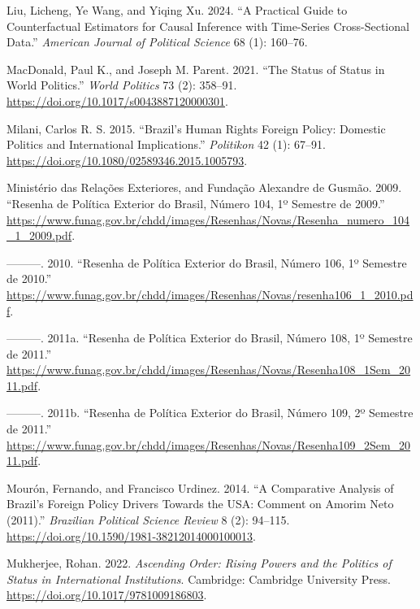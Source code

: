 \documentclass[
  12pt,
]{article}
\newlength{\cslhangindent}
\newenvironment{CSLReferences}[2] %
 {\begin{list}{}{%
  \setlength{\itemindent}{0pt}
  \setlength{\leftmargin}{0pt}
  \setlength{\parsep}{0pt}
  \ifodd #1
   \setlength{\leftmargin}{\cslhangindent}
   \setlength{\itemindent}{-1\cslhangindent}
  \fi
  \setlength{\itemsep}{#2\baselineskip}}}
 {\end{list}}
\begin{document}
\begin{CSLReferences}{1}{0}
Liu, Licheng, Ye Wang, and Yiqing Xu. 2024. {``A Practical Guide to Counterfactual Estimators for Causal Inference with Time-Series Cross-Sectional Data.''} \emph{American Journal of Political Science} 68 (1): 160--76.

MacDonald, Paul K., and Joseph M. Parent. 2021. {``The {Status} of {Status} in {World Politics}.''} \emph{World Politics} 73 (2): 358--91. \url{https://doi.org/10.1017/s0043887120000301}.

Milani, Carlos R. S. 2015. {``{Brazil}'s Human Rights Foreign Policy: Domestic Politics and International Implications.''} \emph{Politikon} 42 (1): 67--91. \url{https://doi.org/10.1080/02589346.2015.1005793}.

Ministério das Relações Exteriores, and Fundação Alexandre de Gusmão. 2009. {``Resenha de Política Exterior do Brasil, Número 104, 1º Semestre de 2009.''} \url{https://www.funag.gov.br/chdd/images/Resenhas/Novas/Resenha_numero_104_1_2009.pdf}.

---------. 2010. {``Resenha de Política Exterior do Brasil, Número 106, 1º Semestre de 2010.''} \url{https://www.funag.gov.br/chdd/images/Resenhas/Novas/resenha106_1_2010.pdf}.

---------. 2011a. {``Resenha de Política Exterior do Brasil, Número 108, 1º Semestre de 2011.''} \url{https://www.funag.gov.br/chdd/images/Resenhas/Novas/Resenha108_1Sem_2011.pdf}.

---------. 2011b. {``Resenha de Política Exterior do Brasil, Número 109, 2º Semestre de 2011.''} \url{https://www.funag.gov.br/chdd/images/Resenhas/Novas/Resenha109_2Sem_2011.pdf}.

Mourón, Fernando, and Francisco Urdinez. 2014. {``A {Comparative Analysis} of {Brazil}'s {Foreign Policy Drivers Towards} the {USA}: {Comment} on {Amorim Neto} (2011).''} \emph{Brazilian Political Science Review} 8 (2): 94--115. \url{https://doi.org/10.1590/1981-38212014000100013}.

Mukherjee, Rohan. 2022. \emph{Ascending Order: Rising Powers and the Politics of Status in International Institutions}. Cambridge: Cambridge University Press. \url{https://doi.org/10.1017/9781009186803}.


\end{CSLReferences}
\end{document}
